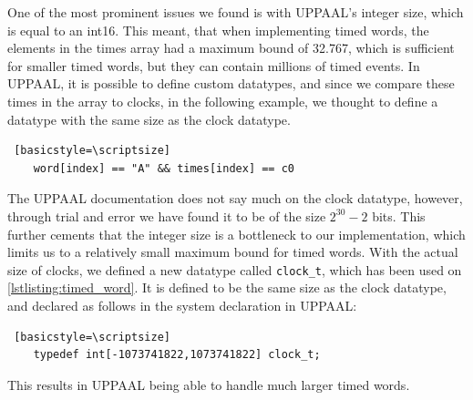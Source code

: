 
One of the most prominent issues we found is with UPPAAL's integer size, which is equal to an int16. This meant, that when implementing timed words, the elements in the times array had a maximum bound of 32.767, which is sufficient for smaller timed words, but they can contain millions of timed events. In UPPAAL, it is possible to define custom datatypes, and since we compare these times in the array to clocks, in the following example, we thought to define a datatype with the same size as the clock datatype.

\begin{lstlisting} [basicstyle=\scriptsize]
    word[index] == "A" && times[index] == c0
\end{lstlisting}

The UPPAAL documentation does not say much on the clock datatype, however, through trial and error we have found it to be of the size $2^{30}-2$ bits.
This further cements that the integer size is a bottleneck to our implementation, which limits us to a relatively small maximum bound for timed words.
With the actual size of clocks, we defined a new datatype called \verb|clock_t|, which has been used on \cref{lstlisting:timed_word}. It is defined to be the same size as the clock datatype, and declared as follows in the system declaration in UPPAAL:

\begin{lstlisting} [basicstyle=\scriptsize]
    typedef int[-1073741822,1073741822] clock_t;
\end{lstlisting}

This results in UPPAAL being able to handle much larger timed words.


